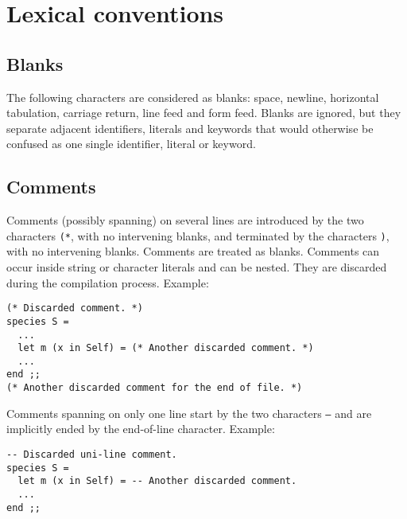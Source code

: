 

\section{Lexical conventions}



\subsection{Blanks}
The following characters are considered as blanks: space, newline,
horizontal tabulation, carriage return, line feed and form
feed. Blanks are ignored, but they separate adjacent identifiers,
literals and keywords that would otherwise be confused as one single
identifier, literal or keyword.



\subsection{Comments}
Comments (possibly spanning) on several lines are introduced by the
two characters {\tt (*}, with no intervening blanks, and terminated by
the characters {\tt *)}, with no intervening blanks. Comments are
treated as blanks. Comments can occur inside string or character
literals and can be nested. They are discarded during the compilation
process. Example:
{\scriptsize
\begin{lstlisting}
(* Discarded comment. *)
species S =
  ...
  let m (x in Self) = (* Another discarded comment. *)
  ...
end ;;
(* Another discarded comment for the end of file. *)
\end{lstlisting}
}


Comments spanning on only one line start by the two characters
{\tt --} and are implicitly ended by the end-of-line character.
Example:
{\scriptsize
\begin{lstlisting}
-- Discarded uni-line comment.
species S =
  let m (x in Self) = -- Another discarded comment.
  ...
end ;;
\end{lstlisting}
}



